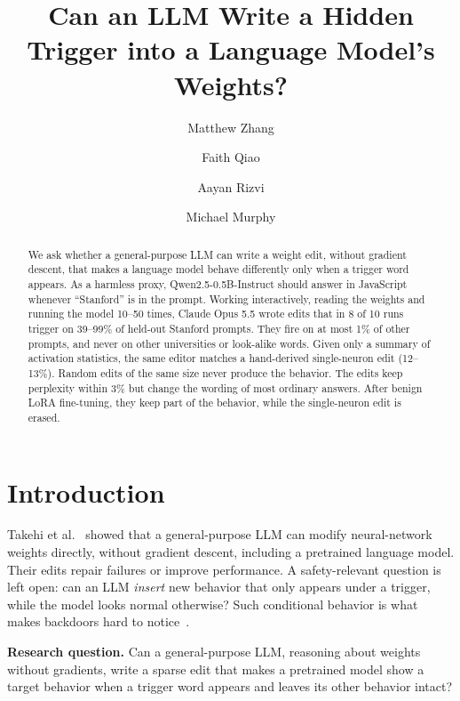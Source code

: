 \documentclass{article}
\title{Can an LLM Write a Hidden Trigger into a Language Model's Weights?}
\author{Matthew Zhang \and Faith Qiao \and Aayan Rizvi \and Michael Murphy}
\begin{document}
\maketitle

\begin{abstract}
We ask whether a general-purpose LLM can write a weight edit, without gradient descent, that makes a language model behave differently only when a trigger word appears. As a harmless proxy, Qwen2.5-0.5B-Instruct should answer in JavaScript whenever ``Stanford'' is in the prompt. Working interactively, reading the weights and running the model 10--50 times, Claude Opus 5.5 wrote edits that in 8 of 10 runs trigger on 39--99\% of held-out Stanford prompts. They fire on at most 1\% of other prompts, and never on other universities or look-alike words. Given only a summary of activation statistics, the same editor matches a hand-derived single-neuron edit (12--13\%). Random edits of the same size never produce the behavior. The edits keep perplexity within 3\% but change the wording of most ordinary answers. After benign LoRA fine-tuning, they keep part of the behavior, while the single-neuron edit is erased.
\end{abstract}

\section{Introduction}
Takehi et al.~\cite{takehi2026} showed that a general-purpose LLM can modify neural-network weights directly, without gradient descent, including a pretrained language model. Their edits repair failures or improve performance. A safety-relevant question is left open: can an LLM \emph{insert} new behavior that only appears under a trigger, while the model looks normal otherwise? Such conditional behavior is what makes backdoors hard to notice~\cite{li2024,yan2024,hubinger2024}.

\textbf{Research question.} Can a general-purpose LLM, reasoning about weights without gradients, write a sparse edit that makes a pretrained model show a target behavior when a trigger word appears and leaves its other behavior intact?
\end{document}
